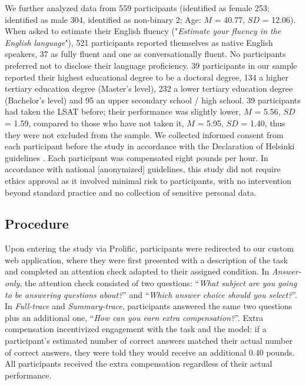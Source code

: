 \documentclass[manuscript, anonymous=false,authorversion,review=false]{acmart}
\begin{document}
We further analyzed data from 559 participants (identified as female 253; identified as male 304, identified as non-binary 2; Age: $M$ = 40.77, $SD$ = 12.06). When asked to estimate their English fluency ("\textit{Estimate your fluency in the English language}"), 521 participants reported themselves as native English speakers, 37 as fully fluent and one as conversationally fluent. No participants preferred not to disclose their language proficiency. 39 participants in our sample reported their highest educational degree to be a doctoral degree, 134 a higher tertiary education degree (Master's level), 232 a lower tertiary education degree (Bachelor's level) and 95 an upper secondary school / high school. 
39 participants had taken the LSAT before; their performance was slightly lower, $M$ = 5.56, $SD$ = 1.59, compared to those who have not taken it, $M$ = 5.95, $SD$ = 1.40, thus they were not excluded from the sample. We collected informed consent from each participant before the study in accordance with the Declaration of Helsinki guidelines \cite{world2013world}. Each participant was compensated eight pounds per hour. In accordance with national [anonymized] guidelines, %
this study did not require ethics approval as it involved minimal risk to participants, with no intervention beyond standard practice and no collection of sensitive personal data. %


\subsection{Procedure}

Upon entering the study via Prolific, participants were redirected to our custom web application, where they were first presented with a description of the task and completed an attention check adapted to their assigned condition. In \textit{Answer-only}, the attention check consisted of two questions: ``\textit{What subject are you going to be answering questions about?}'' and ``\textit{Which answer choice should you select?}''. In \textit{Full-trace} and \textit{Summary-trace}, participants answered the same two questions plus an additional one, ``\textit{How can you earn extra compensation?}''. Extra compensation incentivized engagement with the task and the model: if a participant's estimated number of correct answers matched their actual number of correct answers, they were told they would receive an additional 0.40 pounds. All participants received the extra compensation regardless of their actual performance.
\end{document}
